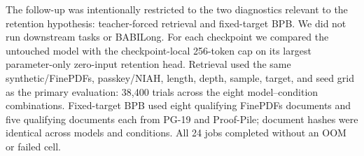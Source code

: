 The follow-up was intentionally restricted to the two diagnostics relevant to the retention hypothesis: teacher-forced retrieval and fixed-target BPB. We did not run downstream tasks or BABILong. For each checkpoint we compared the untouched model with the checkpoint-local 256-token cap on its largest parameter-only zero-input retention head. Retrieval used the same synthetic/FinePDFs, passkey/NIAH, length, depth, sample, target, and seed grid as the primary evaluation: 38,400 trials across the eight model--condition combinations. Fixed-target BPB used eight qualifying FinePDFs documents and five qualifying documents each from PG-19 and Proof-Pile; document hashes were identical across models and conditions. All 24 jobs completed without an OOM or failed cell.

\begin{table}[ht]
\centering
\small
\setlength{\tabcolsep}{3.2pt}
\caption{Seed-level replication endpoints. Each metric reports untouched $\rightarrow$ capped evaluation. Retrieval averages passkey and NIAH, three depths, and synthetic and real-text suites; values are percentages. $H_{1/2}$ is the maximum parameter-only zero-input operating point, with zero-indexed block/head coordinates.}
\label{table:replication_endpoints}
\end{table}

